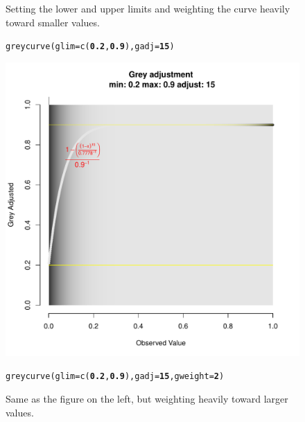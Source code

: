 \documentclass[letterpaper]{article}\usepackage[]{graphicx}\usepackage[]{color}
\makeatletter
\newcommand{\hlnum}[1]{\textcolor[rgb]{0.502,0,0.502}{\textbf{#1}}}%
\newcommand{\hlstd}[1]{\textcolor[rgb]{0,0,0}{#1}}%
\newcommand{\hlkwc}[1]{\textcolor[rgb]{0,0.502,0.753}{#1}}%
\newcommand{\hlkwd}[1]{\textcolor[rgb]{0,0.267,0.4}{#1}}%
\newenvironment{kframe}{%
 \def\at@end@of@kframe{}%
 \ifinner\ifhmode%
  \def\at@end@of@kframe{\end{minipage}}%
  \begin{minipage}{\columnwidth}%
 \fi\fi%
 \def\FrameCommand##1{\hskip\@totalleftmargin \hskip-\fboxsep
 \colorbox{shadecolor}{##1}\hskip-\fboxsep
     \hskip-\linewidth \hskip-\@totalleftmargin \hskip\columnwidth}%
 \MakeFramed {\advance\hsize-\width
   \@totalleftmargin\z@ \linewidth\hsize
   \@setminipage}}%
 {\par\unskip\endMakeFramed%
 \at@end@of@kframe}
\newenvironment{knitrout}{}{} %
\makeatother
\begin{document}
\begin{figure}[h!]
\begin{minipage}[b]{0.45\linewidth}
\centering
\caption{\footnotesize Setting the lower and upper limits and weighting the curve heavily toward smaller values.}
\begin{knitrout}\footnotesize
{}\color{fgcolor}\begin{kframe}
\begin{alltt}
\hlkwd{greycurve}\hlstd{(}\hlkwc{glim} \hlstd{=} \hlkwd{c}\hlstd{(}\hlnum{0.2}\hlstd{,} \hlnum{0.9}\hlstd{),} \hlkwc{gadj} \hlstd{=} \hlnum{15}\hlstd{)}
\end{alltt}
\end{kframe}

{\centering \includegraphics[width=\linewidth]{figure/greycurve_small_heavy} 

}



\end{knitrout}

\end{minipage}
\hspace{0.5cm}
\begin{minipage}[b]{0.45\linewidth}
\centering
\caption{\footnotesize Same as the figure on the left, but weighting heavily toward larger values.}
\begin{knitrout}\footnotesize
{}\color{fgcolor}\begin{kframe}
\begin{alltt}
\hlkwd{greycurve}\hlstd{(}\hlkwc{glim} \hlstd{=} \hlkwd{c}\hlstd{(}\hlnum{0.2}\hlstd{,} \hlnum{0.9}\hlstd{),} \hlkwc{gadj} \hlstd{=} \hlnum{15}\hlstd{,} \hlkwc{gweight} \hlstd{=} \hlnum{2}\hlstd{)}
\end{alltt}
\end{kframe}


\end{knitrout}
\end{minipage}
\end{figure}
\end{document}
